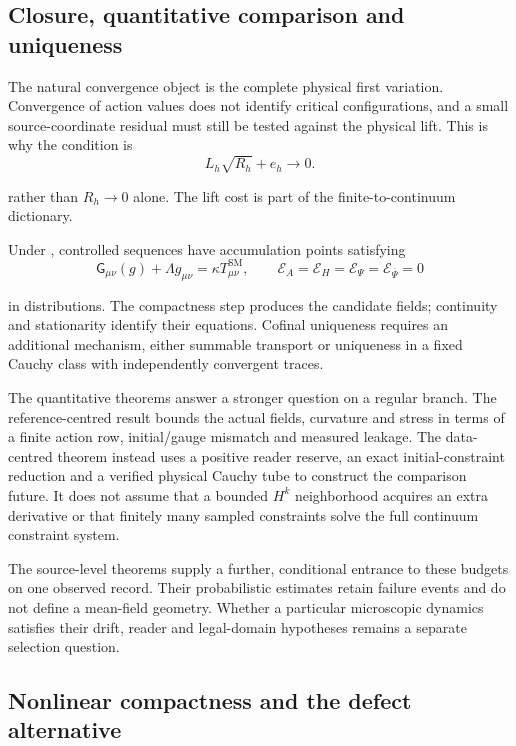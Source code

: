 \documentclass[11pt]{article}
\numberwithin{equation}{section}
\theoremstyle{definition}
\theoremstyle{remark}
\newcommand{\Eins}{\mathsf G}
\newcommand{\Evar}{\mathcal E}
\newcommand{\bPsi}{\overline\Psi}
\begin{document}
\subsection{Closure, quantitative comparison and uniqueness}

The natural convergence object is the complete physical first variation.
Convergence of action values does not identify critical configurations, and
a small source-coordinate residual must still be tested against the
physical lift. This is why the condition is
\begin{equation}
L_h\sqrt{R_h}+e_h\longrightarrow0.
\label{eq:discussion-scaled-stationarity}
\end{equation}

rather than $R_h\to0$ alone. The lift cost is part of the
finite-to-continuum dictionary.

Under , controlled sequences have accumulation
points satisfying
\begin{equation}
\Eins_{\mu\nu}(g)+\Lambda g_{\mu\nu}
=
\kappa T^{\mathrm{SM}}_{\mu\nu},
\qquad
\Evar_A=\Evar_H=\Evar_\Psi=\Evar_{\bPsi}=0
\label{eq:discussion-ESM}
\end{equation}

in distributions. The compactness step produces the candidate fields;
continuity and stationarity identify their equations. Cofinal uniqueness
requires an additional mechanism, either summable transport or uniqueness
in a fixed Cauchy class with independently convergent traces.

The quantitative theorems answer a stronger question on a regular branch.
The reference-centred result bounds the actual fields, curvature and stress
in terms of a finite action row, initial/gauge mismatch and measured leakage.
The data-centred theorem instead uses a positive reader reserve, an exact
initial-constraint reduction and a verified physical Cauchy tube to construct
the comparison future. It does not assume that a bounded $H^k$ neighborhood
acquires an extra derivative or that finitely many sampled constraints solve
the full continuum constraint system.

The source-level theorems supply a further, conditional entrance to these
budgets on one observed record. Their probabilistic estimates retain failure
events and do not define a mean-field geometry. Whether a particular
microscopic dynamics satisfies their drift, reader and legal-domain
hypotheses remains a separate selection question.

\subsection{Nonlinear compactness and the defect alternative}
\end{document}
